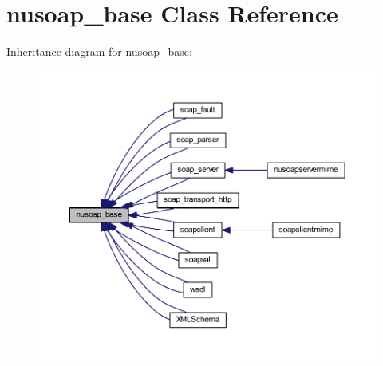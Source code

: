 \hypertarget{classnusoap__base}{\section{nusoap\-\_\-base Class Reference}
\label{classnusoap__base}
}


Inheritance diagram for nusoap\-\_\-base\-:
\nopagebreak
\begin{figure}[H]
\begin{center}
\leavevmode
\includegraphics[width=350pt]{classnusoap__base__inherit__graph}
\end{center}
\end{figure}
